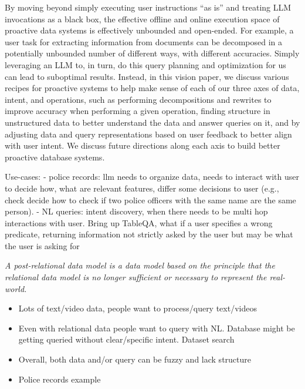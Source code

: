 By moving beyond simply executing user
instructions ``as is''
and treating LLM invocations as a black box,
the effective offline and online
execution space of proactive data
systems is effectively unbounded
and open-ended. 
For example, a user task
for extracting information 
from documents can be decomposed
in a potentially unbounded number of 
different ways, with different
accuracies.
Simply leveraging an LLM to, in turn,
do this query planning and optimization for us
can lead to suboptimal results.
Instead, in this vision paper,
we discuss various recipes for
proactive systems to
help make sense of
each of our three axes of data, intent, and operations,
such as performing decompositions 
and rewrites to improve accuracy when performing a given operation, 
finding structure in unstructured data 
to better understand the data 
and answer queries on it, 
and by adjusting data and 
query representations based 
on user feedback to better 
align with user intent.  
We discuss future directions 
along each axis to build better proactive database systems. 







\newpage

Use-cases:
- police records: llm needs to organize data, needs to interact with user to decide how, what are relevant features, differ some decisions to user (e.g., check decide how to check if two police officers with the same name are the same person). 
- NL queries: intent discovery, when there needs to be multi hop interactions with user. Bring up TableQA, what if a user specifies a wrong predicate, returning information not strictly asked by the user but may be what the user is asking for


\textit{A post-relational data model is a data model based on the principle that the relational data model is no longer sufficient or necessary to represent the real-world.}

\begin{itemize}
    \item Lots of text/video data, people want to process/query text/videos
    \item Even with relational data people want to query with NL. Database might be getting queried without clear/specific intent. Dataset search
    \item Overall, both data and/or query can be fuzzy and lack structure
    \item Police records example
\end{itemize}

